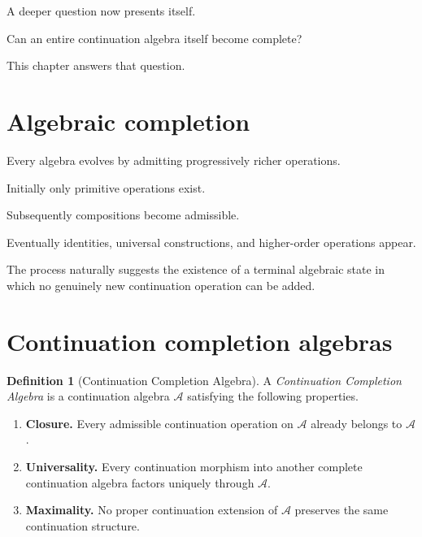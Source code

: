 \documentclass[13pt,openany]{book}
\theoremstyle{plain}
\theoremstyle{definition}
\newtheorem{definition}{Definition}[chapter]
\begin{document}
A deeper question now presents itself.

Can an entire continuation algebra itself become complete?

This chapter answers that question.

\section{Algebraic completion}

Every algebra evolves by admitting progressively richer operations.

Initially only primitive operations exist.

Subsequently compositions become admissible.

Eventually identities, universal constructions, and higher-order operations
appear.

The process naturally suggests the existence of a terminal algebraic state in
which no genuinely new continuation operation can be added.

\section{Continuation completion algebras}

\begin{definition}[Continuation Completion Algebra]
A \emph{Continuation Completion Algebra} is a continuation algebra
\(\mathcal A\) satisfying the following properties.

\begin{enumerate}

\item
\textbf{Closure.}
Every admissible continuation operation on \(\mathcal A\) already belongs to
\(\mathcal A\).

\item
\textbf{Universality.}
Every continuation morphism into another complete continuation algebra factors
uniquely through \(\mathcal A\).

\item
\textbf{Maximality.}
No proper continuation extension of \(\mathcal A\) preserves the same
continuation structure.

\end{enumerate}

\end{definition}
\end{document}
